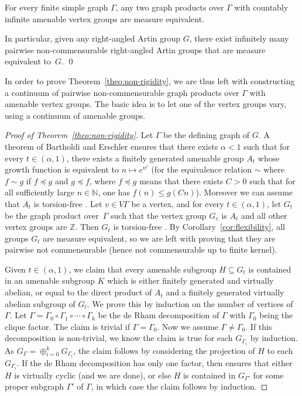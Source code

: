 \begin{cor}\label{cor:flexibility}
For every finite simple graph $\Gamma$, any two graph products over $\Gamma$ with countably infinite amenable vertex groups are measure equivalent.

In particular, given any right-angled Artin group $G$, there exist infinitely many pairwise non-commensurable right-angled Artin groups that are measure equivalent to~$G$.
\qed
\end{cor}

In order to prove Theorem~\ref{theo:non-rigidity}, we are thus left with constructing a continuum of pairwise non-commensurable graph products over $\Gamma$ with amenable vertex groups. The basic idea is to let one of the vertex groups vary, using a continuum of amenable groups.

\begin{proof}[Proof of Theorem~\ref{theo:non-rigidity}]
Let $\Gamma$ be the defining graph of $G$. A theorem of Bartholdi and Erschler \cite{BE} ensures that there exists $\alpha<1$ such that for every $t\in (\alpha,1)$, there exists a finitely generated amenable group $A_t$ whose growth function is equivalent to $n\mapsto e^{n^{t}}$ (for the equivalence relation $\sim$ where $f\sim g$ if $f\preceq g$ and $g\preceq f$, where $f\preceq g$ means that there exists $C>0$ such that for all sufficiently large $n\in\mathbb{N}$, one has $f(n)\le g(Cn)$). Moreover we can assume that $A_t$ is torsion-free \cite[Rem.\,1.1]{BE}. Let $v\in V\Gamma$ be a vertex, and for every $t\in (\alpha,1)$, let $G_t$ be the graph product over~$\Gamma$ such that the vertex group $G_v$ is $A_t$ and all other vertex groups are $\mathbb Z$. Then $G_t$ is torsion-free \cite[Cor.\,5.9]{antolin2015tits}. By Corollary~\ref{cor:flexibility}, all groups $G_t$ are measure equivalent, so we are left with proving that they are pairwise not commensurable (hence not commensurable up to finite kernel).

Given $t\in (\alpha,1)$, we claim that every amenable subgroup $H\subseteq G_t$ is contained in an amenable subgroup $K$ which is either finitely generated and virtually abelian, or equal to the direct product of $A_t$ and a finitely generated virtually abelian subgroup of $G_t$. We prove this by induction on the number of vertices of $\Gamma$. Let $\Gamma=\Gamma_0\circ \Gamma_1\circ\cdots\circ\Gamma_k$ be the de Rham decomposition of $\Gamma$ with $\Gamma_0$ being the clique factor. The claim is trivial if $\Gamma=\Gamma_0$. Now we assume $\Gamma\neq\Gamma_0$. If this decomposition is non-trivial, we know the claim is true for each $G_{\Gamma_i}$ by induction. As $G_{\Gamma}=\oplus_{i=0}^kG_{\Gamma_i}$, the claim follows by considering the projection of $H$ to each $G_{\Gamma_i}$. If the de Rham decomposition has only one factor, then \cite[Th.\,4.1]{antolin2015tits} ensures that either $H$ is virtually cyclic (and we are done), or else $H$ is contained in $G_{\Gamma'}$ for some proper subgraph $\Gamma'$ of $\Gamma$, in which case the claim follows by induction.


\end{proof}
